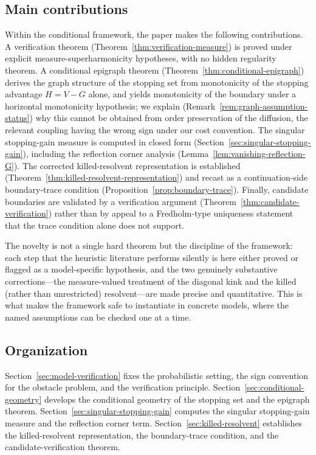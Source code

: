 \documentclass[pdflatex,sn-mathphys-num]{sn-jnl}
\theoremstyle{plain}
\theoremstyle{definition}
\begin{document}
\subsection{Main contributions}
\label{sec:intro-contributions}
Within the conditional framework, the paper makes the following contributions.
A verification theorem (Theorem~\ref{thm:verification-measure}) is proved under
explicit measure-superharmonicity hypotheses, with no hidden regularity
theorem. A conditional epigraph theorem
(Theorem~\ref{thm:conditional-epigraph}) derives the graph structure of the
stopping set from monotonicity of the stopping advantage $H=V-G$ alone, and
yields monotonicity of the boundary under a horizontal monotonicity
hypothesis; we explain (Remark~\ref{rem:graph-assumption-status}) why this
cannot be obtained from order preservation of the diffusion, the relevant
coupling having the wrong sign under our cost convention. The singular
stopping-gain measure is computed in closed form
(Section~\ref{sec:singular-stopping-gain}), including the reflection corner
analysis (Lemma~\ref{lem:vanishing-reflection-G}). The corrected
killed-resolvent representation is established
(Theorem~\ref{thm:killed-resolvent-representation}) and recast as a
continuation-side boundary-trace condition
(Proposition~\ref{prop:boundary-trace}). Finally, candidate boundaries are
validated by a verification argument
(Theorem~\ref{thm:candidate-verification}) rather than by appeal to a
Fredholm-type uniqueness statement that the trace condition alone does not
support.

The novelty is not a single hard theorem but the discipline of the framework:
each step that the heuristic literature performs silently is here either
proved or flagged as a model-specific hypothesis, and the two genuinely
substantive corrections---the measure-valued treatment of the diagonal kink
and the killed (rather than unrestricted) resolvent---are made precise and
quantitative. This is what makes the framework safe to instantiate in concrete
models, where the named assumptions can be checked one at a time.

\subsection{Organization}
\label{sec:intro-organization}
Section~\ref{sec:model-verification} fixes the probabilistic setting, the sign
convention for the obstacle problem, and the verification principle.
Section~\ref{sec:conditional-geometry} develops the conditional geometry of the
stopping set and the epigraph theorem. Section~\ref{sec:singular-stopping-gain}
computes the singular stopping-gain measure and the reflection corner term.
Section~\ref{sec:killed-resolvent} establishes the killed-resolvent
representation, the boundary-trace condition, and the candidate-verification
theorem.
\end{document}
